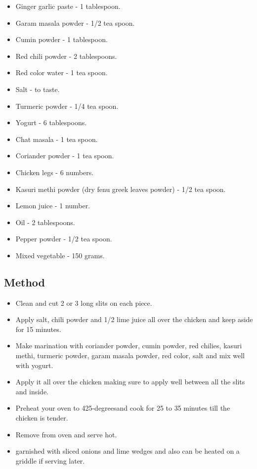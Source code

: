 \documentclass[
]{article}
\providecommand{\tightlist}{%
  \setlength{\itemsep}{0pt}\setlength{\parskip}{0pt}}
\begin{document}
\begin{itemize}
\tightlist
\item
  Ginger garlic paste - 1 tablespoon.
\item
  Garam masala powder - 1/2 tea spoon.
\item
  Cumin powder - 1 tablespoon.
\item
  Red chili powder - 2 tablespoons.
\item
  Red color water - 1 tea spoon.
\item
  Salt - to taste.
\item
  Turmeric powder - 1/4 tea spoon.
\item
  Yogurt - 6 tablespoons.
\item
  Chat masala - 1 tea spoon.
\item
  Coriander powder - 1 tea spoon.
\item
  Chicken legs - 6 numbers.
\item
  Kasuri methi powder (dry fenu greek leaves powder) - 1/2 tea spoon.
\item
  Lemon juice - 1 number.
\item
  Oil - 2 tablespoons.
\item
  Pepper powder - 1/2 tea spoon.
\item
  Mixed vegetable - 150 grams.
\end{itemize}

\hypertarget{method}{%
\subsection{Method}\label{method}}

\begin{itemize}
\tightlist
\item
  Clean and cut 2 or 3 long slits on each piece.
\item
  Apply salt, chili powder and 1/2 lime juice all over the chicken and keep aside for 15 minutes.
\item
  Make marination with coriander powder, cumin powder, red chilies, kasuri methi, turmeric powder, garam masala powder, red color, salt and mix well with yogurt.
\item
  Apply it all over the chicken making sure to apply well between all the slits and inside.
\item
  Preheat your oven to 425-degreesand cook for 25 to 35 minutes till the chicken is tender.
\item
  Remove from oven and serve hot.
\item
  garnished with sliced onions and lime wedges and also can be heated on a griddle if serving later.
\end{itemize}
\end{document}
